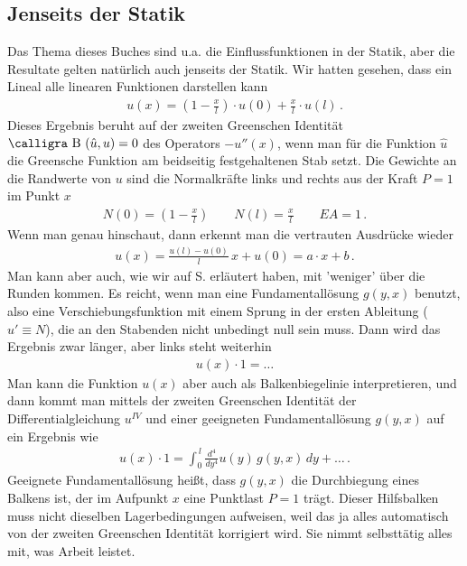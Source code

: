 {{{%
\textcolor{blau2}{\subsection{Jenseits der Statik}}
Das Thema dieses Buches sind u.a. die Einflussfunktionen in der Statik, aber die Resultate gelten nat\"{u}rlich auch jenseits der Statik. Wir hatten gesehen, dass ein Lineal alle linearen Funktionen darstellen kann
\begin{align}
u(x) = (1 - \frac{x}{l}) \cdot u(0) + \frac{x}{l} \cdot u(l)\,.
\end{align}
Dieses Ergebnis beruht auf der zweiten Greenschen Identit\"{a}t $\text{\normalfont\calligra B\,\,}(\hat{u},u) = 0$ des Operators $-u''(x)$, wenn man f\"{u}r die Funktion $\hat{u}$ die Greensche Funktion am beidseitig festgehaltenen Stab setzt. Die Gewichte an die Randwerte von $u$ sind die Normalkr\"{a}fte links und rechts aus der Kraft $P = 1$ im Punkt $x$
\begin{align}
N(0) = (1 - \frac{x}{l}) \qquad N(l) = \frac{x}{l} \qquad EA = 1\,.
\end{align}
Wenn man genau hinschaut, dann erkennt man die vertrauten Ausdr\"{u}cke wieder
\begin{align}
u(x) = \frac{u(l) - u(0)}{l}\,x + u(0) = a \cdot x + b\,.
\end{align}
Man kann aber auch, wie wir auf S. \pageref{Eq84} erl\"{a}utert haben, mit 'weniger' \"{u}ber die Runden
kommen. Es reicht, wenn man eine Fundamentall\"{o}sung $g(y,x)$ benutzt, also eine Verschiebungsfunktion mit einem Sprung in der ersten Ableitung ($u' \equiv N$), die an den Stabenden nicht unbedingt null sein muss. Dann wird das Ergebnis zwar l\"{a}nger, aber links steht weiterhin
\begin{align}
u(x) \cdot 1 = \ldots
\end{align}
Man kann die Funktion $u(x)$ aber auch als Balkenbiegelinie interpretieren, und dann kommt man mittels der zweiten Greenschen Identit\"{a}t der Differentialgleichung $u^{IV}$ und einer geeigneten Fundamentall\"{o}sung $g(y,x)$ auf ein Ergebnis wie
\begin{align}
u(x) \cdot 1 = \int_0^{\,l} \frac{d^4}{dy^4} u(y)\,g(y,x)\,dy + \ldots\,.
\end{align}
Geeignete Fundamentall\"{o}sung hei{\ss}t, dass $g(y,x)$ die Durchbiegung eines Balkens ist, der im Aufpunkt $x$ eine Punktlast $P = 1$ tr\"{a}gt. Dieser Hilfsbalken muss nicht dieselben Lagerbedingungen aufweisen, weil das ja alles automatisch von der zweiten Greenschen Identit\"{a}t korrigiert wird. Sie nimmt selbstt\"{a}tig alles mit, was Arbeit leistet.

}}}
